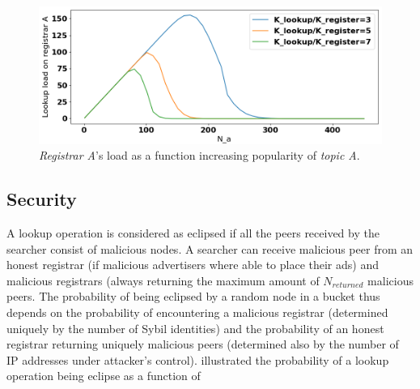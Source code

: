 \begin{figure}[t]
    \includegraphics[width=1\linewidth]{img/fairness_lookup}
    \caption{\emph{Registrar A}'s load as a function increasing popularity of \emph{topic A}.
    }
    \label{fig:fairness_lookup}
\end{figure}

\subsection{Security}

A lookup operation is considered as eclipsed if all the peers received by the searcher consist of malicious nodes. A searcher can receive malicious peer from an honest registrar (if malicious advertisers where able to place their ads) and malicious registrars (always returning the maximum amount of $N_\textit{returned}$ malicious peers. The probability of being eclipsed by a random node in a bucket thus depends on the probability of encountering a malicious registrar (determined uniquely by the number of Sybil identities) and the probability of an honest registrar returning uniquely malicious peers (determined also by the number of IP addresses under attacker's control).  illustrated the probability of a lookup operation being eclipse as a function of 


